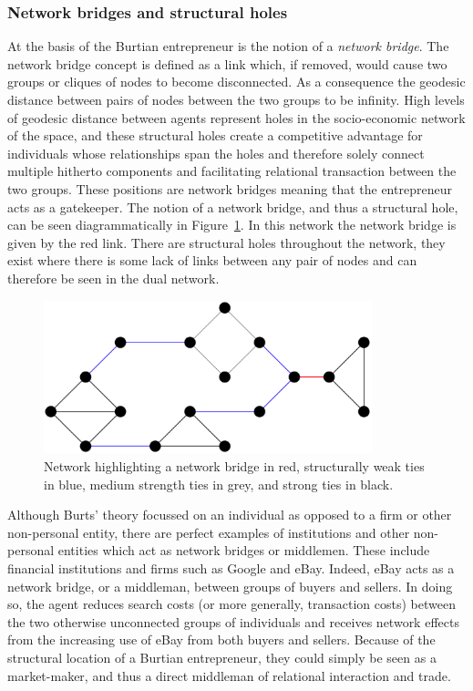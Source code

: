 \subsubsection{Network bridges and structural holes}

At the basis of the Burtian entrepreneur is the notion of a \emph{network bridge}. The network bridge concept is defined as a link which, if removed, would cause two groups or cliques of nodes to become disconnected. As a consequence the geodesic distance between pairs of nodes between the two groups to be infinity. High levels of geodesic distance between agents represent holes in the socio-economic network of the space, and these structural holes create a competitive advantage for individuals whose relationships span the holes and therefore solely connect multiple hitherto components and facilitating relational transaction between the two groups. These positions are network bridges meaning that the entrepreneur acts as a gatekeeper. The notion of a network bridge, and thus a structural hole, can be seen diagrammatically in Figure~\ref{fig:networkbridge}. In this network the network bridge is given by the red link. There are structural holes throughout the network, they exist where there is some lack of links between any pair of nodes and can therefore be seen in the dual network.

\begin{figure}[h!]
\centering
\includegraphics[width=0.85\textwidth]{Images/networkbridge.png}
\caption[Strong ties, weak ties, and network bridges]{Network highlighting a network bridge in red, structurally weak ties in blue, medium strength ties in grey, and strong ties in black.}
\label{fig:networkbridge}
\end{figure}

Although Burts' theory focussed on an individual as opposed to a firm or other non-personal entity, there are perfect examples of institutions and other non-personal entities which act as network bridges or middlemen. These include financial institutions and firms such as Google and eBay. Indeed, eBay acts as a network bridge, or a middleman, between groups of buyers and sellers. In doing so, the agent reduces search costs (or more generally, transaction costs) between the two otherwise unconnected groups of individuals and receives network effects from the increasing use of eBay from both buyers and sellers. Because of the structural location of a Burtian entrepreneur, they could simply be seen as a market-maker, and thus a direct middleman of relational interaction and trade.

